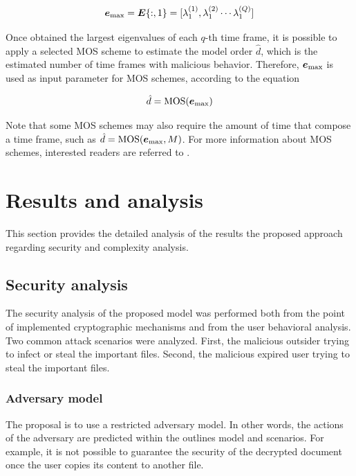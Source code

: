 \documentclass[twocolumn]{svjour3}          	%
\begin{document}
\begin{equation}\label{eq:eq09}
\boldsymbol{e}_{\rm max} = \boldsymbol{E}\{:,1\} = [ \lambda_1^{(1)}, \lambda_1^{(2)} \cdots \lambda_1^{(Q)}]
\end{equation}

Once obtained the largest eigenvalues of each $q$-th time frame, it is possible to apply a selected MOS scheme to estimate the model order $\hat{d}$, which is the estimated number of time frames with malicious behavior. Therefore, $\boldsymbol{e}_{\rm max}$ is used as input parameter for MOS schemes, according to the equation

\begin{equation}\label{eq:eq09}
\hat{d} = \textrm{MOS}(\boldsymbol{e}_{\rm max})
\end{equation}

Note that some MOS schemes may also require the amount of time that compose a time frame, such as $\hat{d} = \textrm{MOS}(\boldsymbol{e}_{\rm max}, M)$. For more information about MOS schemes, interested readers are referred to \cite{da2009comparison}.

\section{Results and analysis}
\label{sec_results}

This section provides the detailed analysis of the results the proposed approach regarding security and complexity analysis.

\subsection{Security analysis}
\label{sec_sec_analysis}
The security analysis of the proposed model was performed both from the point of implemented cryptographic mechanisms and from the user behavioral analysis. Two common attack scenarios were analyzed. First, the malicious outsider trying to infect or steal the important files. Second, the malicious expired user trying to steal the important files. 

\subsubsection{Adversary model}
\label{sec_adversary_model}
The proposal is to use a restricted adversary model. In other words, the actions of the adversary are predicted within the outlines model and scenarios. For example, it is not possible to guarantee the security of the decrypted document once the user copies its content to another file. 
\end{document}
